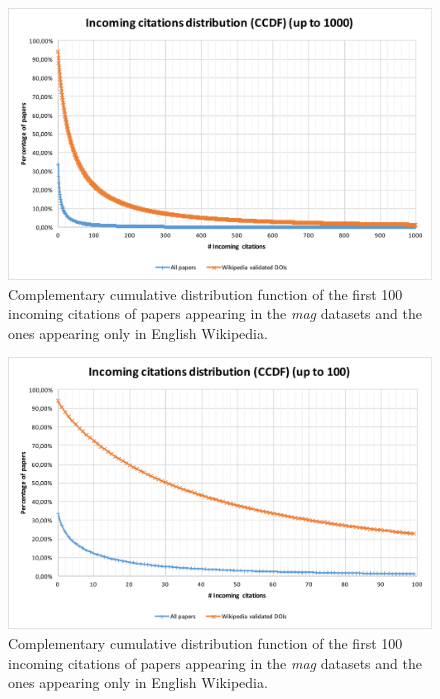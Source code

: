 \begin{figure}[h]
\centering
\includegraphics[keepaspectratio=true, width=\textwidth]{assets/incoming_cits_ccdf_1000}
\caption{Complementary cumulative distribution function of the first 100 incoming citations of papers appearing in the \emph{mag} datasets and the ones appearing only in English Wikipedia.}
\label{fig:incoming_citations_ccdf_1000}
\end{figure}

\begin{figure}[h]
\centering
\includegraphics[keepaspectratio=true, width=\textwidth]{assets/incoming_cits_ccdf_100}
\caption{Complementary cumulative distribution function of the first 100 incoming citations of papers appearing in the \emph{mag} datasets and the ones appearing only in English Wikipedia.}
\label{fig:incoming_citations_ccdf_100}
\end{figure}

